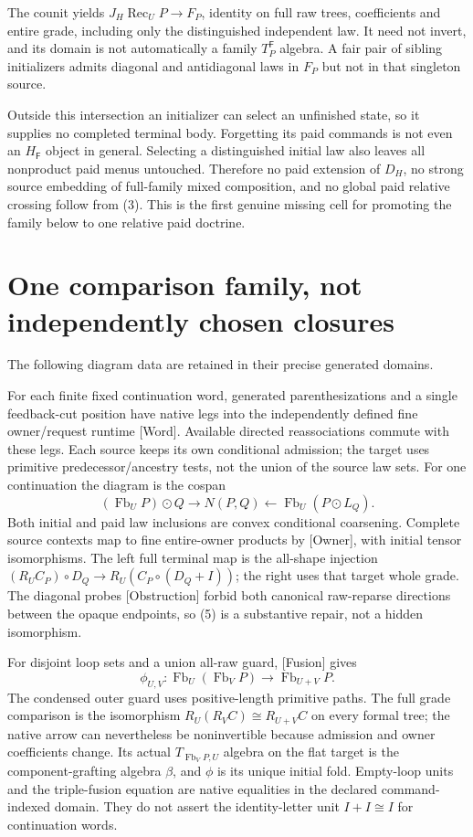 \documentclass[11pt]{article}
\newcommand{\Fb}{\operatorname{Fb}}\newcommand{\Alg}{\operatorname{Alg}}\newcommand{\Par}{\operatorname{Par}}
\begin{document}
The counit yields $J_H\operatorname{Rec}_UP\to F_P$, identity on full raw trees, coefficients and entire grade, including only the distinguished independent law. It need not invert, and its domain is not automatically a family $T_P^{\mathsf F}$ algebra. A fair pair of sibling initializers admits diagonal and antidiagonal laws in $F_P$ but not in that singleton source.

Outside this intersection an initializer can select an unfinished state, so it supplies no completed terminal body. Forgetting its paid commands is not even an $H_{\mathsf F}$ object in general. Selecting a distinguished initial law also leaves all nonproduct paid menus untouched. Therefore no paid extension of $D_H$, no strong source embedding of full-family mixed composition, and no global paid relative crossing follow from (3). This is the first genuine missing cell for promoting the family below to one relative paid doctrine.

\section{One comparison family, not independently chosen closures}
The following diagram data are retained in their precise generated domains.

For each finite fixed continuation word, generated parenthesizations and a single feedback-cut position have native legs into the independently defined fine owner/request runtime [Word]. Available directed reassociations commute with these legs. Each source keeps its own conditional admission; the target uses primitive predecessor/ancestry tests, not the union of the source law sets. For one continuation the diagram is the cospan
\[
 (\Fb_UP)\odot Q\longrightarrow N(P,Q)\longleftarrow\Fb_U(P\odot L_Q). \tag{5}
\]
Both initial and paid law inclusions are convex conditional coarsening. Complete source contexts map to fine entire-owner products by [Owner], with initial tensor isomorphisms. The left full terminal map is the all-shape injection
$(R_UC_P)\circ D_Q\to R_U(C_P\circ(D_Q+I))$; the right uses that target whole grade. The diagonal probes [Obstruction] forbid both canonical raw-reparse directions between the opaque endpoints, so (5) is a substantive repair, not a hidden isomorphism.

For disjoint loop sets and a union all-raw guard, [Fusion] gives
\[
 \phi_{U,V}:\Fb_U(\Fb_VP)\longrightarrow\Fb_{U+V}P.                  \tag{6}
\]
The condensed outer guard uses positive-length primitive paths. The full grade comparison is the isomorphism $R_U(R_VC)\cong R_{U+V}C$ on every formal tree; the native arrow can nevertheless be noninvertible because admission and owner coefficients change. Its actual $T_{\Fb_VP,U}$ algebra on the flat target is the component-grafting algebra $\beta$, and $\phi$ is its unique initial fold. Empty-loop units and the triple-fusion equation are native equalities in the declared command-indexed domain. They do not assert the identity-letter unit $I+I\cong I$ for continuation words.
\end{document}
